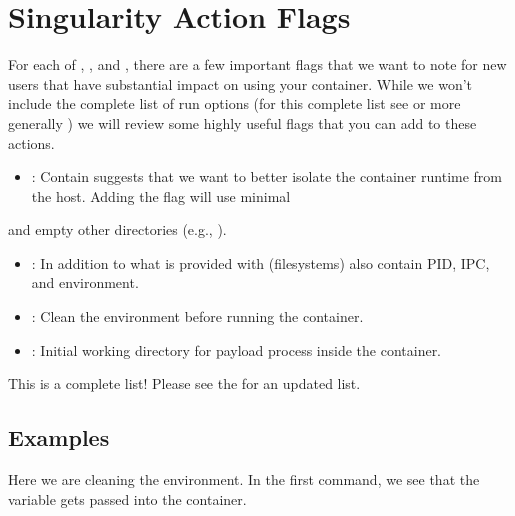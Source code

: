 \documentclass[letterpaper,10pt,english]{sphinxmanual}
\begin{document}
\section{Singularity Action Flags}
\label{\detokenize{appendix:singularity-action-flags}}\label{\detokenize{appendix:sec-action-flags}}
For each of , , and , there are a few important flags that we want to note for new users that have substantial impact on using
your container. While we won’t include the complete list of run options (for this complete list see  or more generally
) we will review some highly useful flags that you can add to these actions.
\begin{itemize}
\item {} 
: Contain suggests that we want to better isolate the container runtime from the host. Adding the  flag will use minimal

\end{itemize}

 and empty other directories (e.g., ).
\begin{itemize}
\item {} 
: In addition to what is provided with  (filesystems) also contain PID, IPC, and environment.

\item {} 
: Clean the environment before running the container.

\item {} 
: Initial working directory for payload process inside the container.

\end{itemize}

This is  a complete list! Please see the  for an updated list.


\subsection{Examples}
\label{\detokenize{appendix:examples}}
Here we are cleaning the environment. In the first command, we see that the variable  gets passed into the container.
\end{document}
